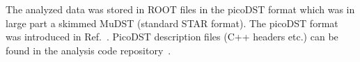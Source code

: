 The analyzed data was stored in ROOT files in the picoDST format which was in large part a skimmed MuDST (standard STAR format). The picoDST format was introduced in Ref.~\cite{PicoDstDescription}. PicoDST description files (C++ headers etc.) can be found in the analysis code repository~\cite{AnalysisCodeRepo}.
% 
% 
% 
% 
% 
